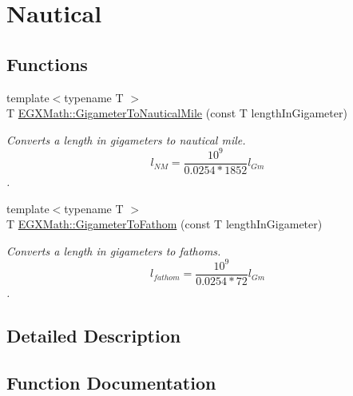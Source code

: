 \hypertarget{group___e_g_x_math-_conversions-_length_conversions-_s_i-_gigameter-_nautical}{}\section{Nautical}
\label{group___e_g_x_math-_conversions-_length_conversions-_s_i-_gigameter-_nautical}
\subsection*{Functions}
\begin{DoxyCompactItemize}
\item 
{\footnotesize template$<$typename T $>$ }\\T \mbox{\hyperlink{group___e_g_x_math-_conversions-_length_conversions-_s_i-_gigameter-_nautical_ga52d7a5290f284cdfec247ba606967867}{E\+G\+X\+Math\+::\+Gigameter\+To\+Nautical\+Mile}} (const T length\+In\+Gigameter)
\begin{DoxyCompactList}\small\item\em Converts a length in gigameters to nautical mile. \[ l_{NM}= \frac{10^{9}}{0.0254 * 1852} l_{Gm} \]. \end{DoxyCompactList}\item 
{\footnotesize template$<$typename T $>$ }\\T \mbox{\hyperlink{group___e_g_x_math-_conversions-_length_conversions-_s_i-_gigameter-_nautical_gac09c5a61b554d3c3c2df3e414aca0e73}{E\+G\+X\+Math\+::\+Gigameter\+To\+Fathom}} (const T length\+In\+Gigameter)
\begin{DoxyCompactList}\small\item\em Converts a length in gigameters to fathoms. \[ l_{fathom}= \frac{10^{9}}{0.0254 * 72} l_{Gm} \]. \end{DoxyCompactList}\end{DoxyCompactItemize}


\subsection{Detailed Description}


\subsection{Function Documentation}
\mbox{\label{group___e_g_x_math-_conversions-_length_conversions-_s_i-_gigameter-_nautical_gac09c5a61b554d3c3c2df3e414aca0e73}} 
